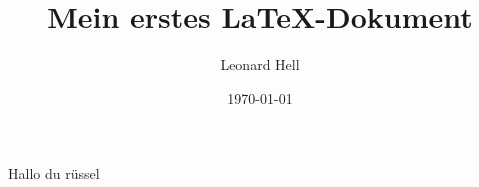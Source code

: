 \documentclass[a4paper,12pt]{article}
\title{Mein erstes LaTeX-Dokument}
\author{Leonard Hell}
\date{\today}
\begin{document}
\maketitle

Hallo du rüssel
\end{document}
